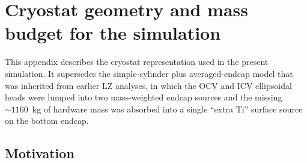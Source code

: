 \documentclass[11pt,a4paper]{article}
\begin{document}
\begin{table}[h]
  \vspace{0.6em}

\end{table}

\appendix

\section{Cryostat geometry and mass budget for the simulation}
\label{app:cryostat-model}

This appendix describes the cryostat representation used in the
present simulation. It supersedes the simple-cylinder plus
averaged-endcap model that was inherited from earlier LZ analyses,
in which the OCV and ICV ellipsoidal heads were lumped into two
mass-weighted endcap sources and the missing $\sim 1160$~kg of
hardware mass was absorbed into a single ``extra Ti'' surface
source on the bottom endcap.

\subsection{Motivation}
\end{document}
